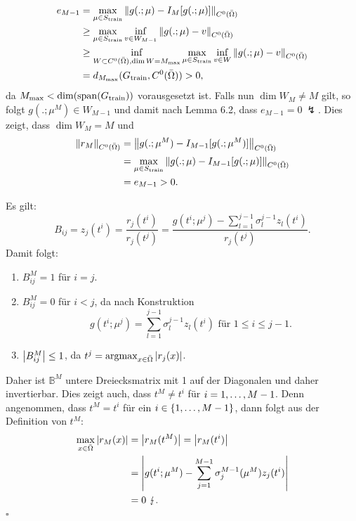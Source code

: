\begin{align*}
e_{M-1} &= \max\limits_{\mu\in S_{\operatorname{train}}} \left\Vert g(.;\mu) - I_M[g(.;\mu)]\right\Vert_{C^0(\bar{\Omega})}\\
&\ge \max\limits_{\mu\in S_{\operatorname{train}}} \inf\limits_{v\in W_{M-1}} \left\Vert g(.;\mu) - v\right\Vert_{C^0(\bar{\Omega})}\\
&\ge \inf\limits_{W \subset C^0(\bar{\Omega}), \dim W = M_{\max}} \max\limits_{\mu\in S_{\operatorname{train}}} \inf\limits_{v\in W} \left\Vert g(.;\mu) - v\right\Vert_{C^0(\bar{\Omega})}\\
&= d_{M_{\max}} ( G_{\operatorname{train}}, C^0(\bar{\Omega})) > 0,
\end{align*}
da $M_{\max} < \dim (\operatorname{span} (G_{\operatorname{train}}))$ vorausgesetzt ist.
Falls nun $\dim W_M\neq M$ gilt, so folgt $g(.;\mu^M)\in W_{M-1}$ und damit nach Lemma 6.2, dass $e_{M-1} = 0~\lightning$.
Dies zeigt, dass $\dim W_M=M$ und
\begin{align*}
\left\Vert r_M\right\Vert_{C^0(\bar{\Omega})} &= \left\Vert g(.;\mu^M) - I_{M-1}[g(.;\mu^M)]\right\Vert_{C^0(\bar{\Omega})}\\
&= \max\limits_{\mu\in S_{\operatorname{train}}} \left\Vert g(.;\mu) - I_{M-1}[g(.;\mu)]\right\Vert_{C^0(\bar{\Omega})}\\
&= e_{M-1} > 0.
\end{align*}

 Es gilt:
\[
B_{ij} = z_j(t^i) = \frac{r_j(t^i)}{r_j(t^j)} = \frac{g(t^i; \mu^j) - \sum_{l=1}^{j-1} \sigma_l^{j-1} z_l(t^i) }{r_j(t^j)}.
\]
Damit folgt:
\begin{enumerate}[(1)]
	\item $B_{ij}^M = 1$ für $i=j$.
	\item $B_{ij}^M = 0$ für $i<j$, da nach Konstruktion
	\[
	g(t^i; \mu^j) = \sum_{l=1}^{j-1} \sigma_l^{j-1} z_l(t^i) \text{ für } 1\le i\le j-1.
	\]
	\item $\left\vert B_{ij}^M\right\vert\le 1$, da $t^j= \operatorname{argmax}_{x\in \bar{\Omega}} \left\vert r_j(x)\right\vert$.
\end{enumerate}
Daher ist $\mathbb{B}^M$ untere Dreiecksmatrix mit 1 auf der Diagonalen und daher invertierbar.
Dies zeigt auch, dass $t^M \neq t^i$ für $i=1, \dots ,M-1$.
Denn angenommen, dass $t^M = t^i$ für ein $i\in \left\{1, \dots ,M-1\right\}$, dann folgt aus der Definition von $t^M$:
\begin{align*}
\max\limits_{x\in \bar{\Omega}} \left\vert r_M(x)\right\vert &= \left\vert r_M(t^M)\right\vert = \left\vert r_M(t^i)\right\vert\\
&= \left\vert g(t^i;\mu^M) - \sum_{j=1}^{M-1} \sigma_j^{M-1}(\mu^M) z_j(t^i)\right\vert\\
&= 0 ~\lightning.
\end{align*}
\hfill $\square$




\cleardoubleoddemptypage

 